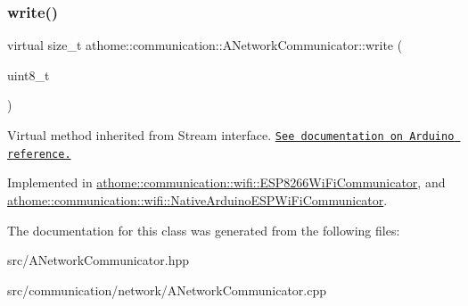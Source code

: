 \subsubsection{\texorpdfstring{write()}{write()}}
{\footnotesize\ttfamily virtual size\+\_\+t athome\+::communication\+::\+A\+Network\+Communicator\+::write (\begin{DoxyParamCaption}\item[{uint8\+\_\+t}]{ }\end{DoxyParamCaption})\hspace{0.3cm}{\ttfamily [pure virtual]}}

Virtual method inherited from Stream interface. \href{https://www.arduino.cc/en/Serial/Write}{\tt See documentation on Arduino reference.} 

Implemented in \mbox{\hyperlink{classathome_1_1communication_1_1wifi_1_1_e_s_p8266_wi_fi_communicator_afd3c1c4ce7d68717a7bb2cf1b9dc962f}{athome\+::communication\+::wifi\+::\+E\+S\+P8266\+Wi\+Fi\+Communicator}}, and \mbox{\hyperlink{classathome_1_1communication_1_1wifi_1_1_native_arduino_e_s_p_wi_fi_communicator_a99fab41ad5275649efafa0a776a0348f}{athome\+::communication\+::wifi\+::\+Native\+Arduino\+E\+S\+P\+Wi\+Fi\+Communicator}}.



The documentation for this class was generated from the following files\+:\begin{DoxyCompactItemize}
\item 
src/A\+Network\+Communicator.\+hpp\item 
src/communication/network/A\+Network\+Communicator.\+cpp\end{DoxyCompactItemize}
